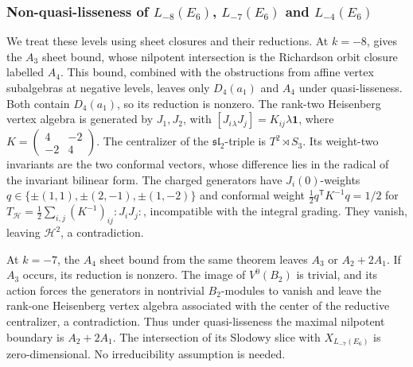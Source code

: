 \documentclass[11pt,a4paper]{amsart}
\numberwithin{equation}{section}
\theoremstyle{definition}
\theoremstyle{remark}
\newcommand{\slg}{\mathfrak{sl}}
\begin{document}
\subsubsection{\texorpdfstring{Non-quasi-lisseness of $L_{-8}(E_6)$, $L_{-7}(E_6)$ and $L_{-4}(E_6)$}{Non-quasi-lisseness of L-8(E6), L-7(E6) and L-4(E6)}}
We treat these levels using sheet closures and their reductions.
At $k=-8$, \cite[Theorem~3.5]{ArakawaFutornyKrizka2024} gives the $A_3$
sheet bound, whose nilpotent intersection is the Richardson orbit
closure labelled $A_4$. This bound, combined with the obstructions from affine vertex subalgebras at negative levels, leaves only $D_4(a_1)$ and $A_4$ under quasi-lisseness.
Both contain $D_4(a_1)$, so its reduction is nonzero. The rank-two Heisenberg vertex algebra is generated by $J_1,J_2$,
with $[J_i{}_{\lambda}J_j]=K_{ij}\lambda\mathbf1$, where
$K=\left(\begin{smallmatrix}4&-2\\-2&4\end{smallmatrix}\right)$.
The centralizer of the $\slg_2$-triple is $T^2\rtimes S_3$. Its weight-two invariants
are the two conformal vectors, whose difference lies in the radical
of the invariant bilinear form. The charged
generators have $J_i(0)$-weights $q\in\{\pm(1,1),\pm(2,-1),\pm(1,-2)\}$
and conformal weight $\tfrac12q^{\mathsf T}K^{-1}q=1/2$
for $T_{\mathcal H}=\tfrac12\sum_{i,j}(K^{-1})_{ij}:J_iJ_j:$,
incompatible with the integral grading. They vanish, leaving
$\mathcal H^2$, a contradiction.

At $k=-7$, the $A_4$ sheet bound from the same theorem leaves
$A_3$ or $A_2+2A_1$. If
$A_3$ occurs, its reduction is nonzero. The image of $V^0(B_2)$ is trivial, and its action forces the generators
in nontrivial $B_2$-modules to vanish and leave the rank-one Heisenberg vertex algebra associated with the
center of the reductive centralizer, a contradiction. Thus under quasi-lisseness the maximal nilpotent
boundary is $A_2+2A_1$. The intersection of its Slodowy slice with
$X_{L_{-7}(E_6)}$ is zero-dimensional. No irreducibility assumption is needed.
\end{document}
